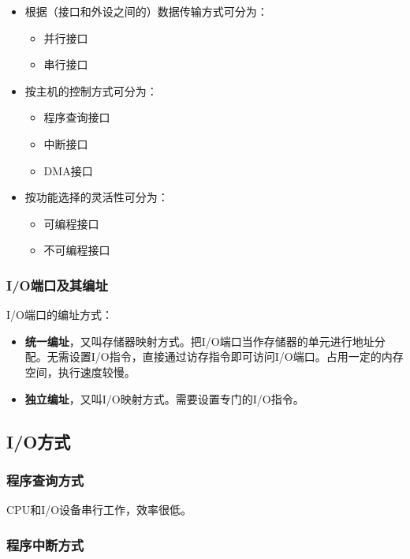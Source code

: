 \documentclass[12pt, a4paper, oneside]{ctexart}
\begin{document}
\begin{itemize}
  \item 根据（接口和外设之间的）数据传输方式可分为：
  \begin{itemize}
    \item 并行接口
    \item 串行接口
  \end{itemize}
  \item 按主机的控制方式可分为：
  \begin{itemize}
    \item 程序查询接口
    \item 中断接口
    \item DMA接口
  \end{itemize}
  \item 按功能选择的灵活性可分为：
  \begin{itemize}
    \item 可编程接口
    \item 不可编程接口
  \end{itemize}
\end{itemize}

\subsubsection{I/O端口及其编址}

I/O端口的编址方式：
\begin{itemize}
  \item {\bf 统一编址}，又叫存储器映射方式。把I/O端口当作存储器的单元进行地址分配。无需设置I/O指令，直接通过访存指令即可访问I/O端口。占用一定的内存空间，执行速度较慢。
  \item {\bf 独立编址}，又叫I/O映射方式。需要设置专门的I/O指令。
\end{itemize}

\subsection{I/O方式}

\subsubsection{程序查询方式}

CPU和I/O设备串行工作，效率很低。

\subsubsection{程序中断方式}
\end{document}
